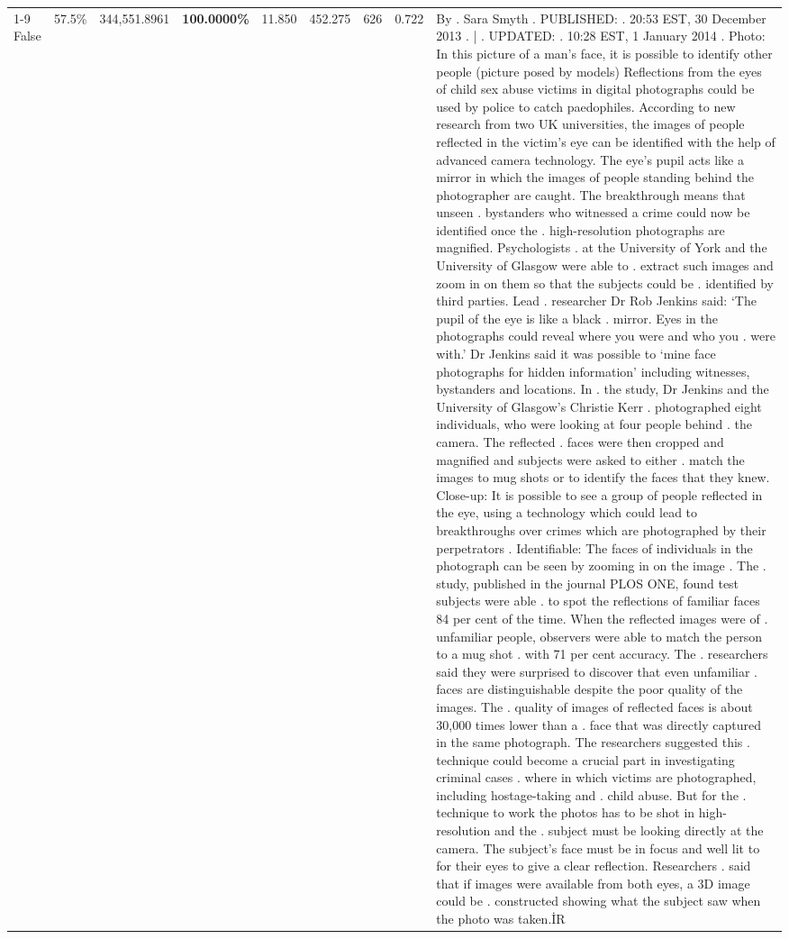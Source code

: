 \begin{table}[H]
\begin{tabular}{lllrlllll}
\cline{1-9}
False & 57.5\% & 344,551.8961 & \bfseries \color{red} 100.0000\% & 11.850 & 452.275 & 626 & 0.722 & By . Sara Smyth . PUBLISHED: . 20:53 EST, 30 December 2013 . | . UPDATED: . 10:28 EST, 1 January 2014 . Photo: In this picture of a man's face, it is possible to identify other people (picture posed by models) Reflections from the eyes of child sex abuse victims in digital photographs could be used by police to catch paedophiles. According to new research from two UK universities, the images of people reflected in the victim's eye can be identified with the help of advanced camera technology. The eye's pupil acts like a mirror in which the images of people standing behind the photographer are caught. The breakthrough means that unseen . bystanders who witnessed a crime could now be identified once the . high-resolution photographs are magnified. Psychologists . at the University of York and the University of Glasgow were able to . extract such images and zoom in on them so that the subjects could be . identified by third parties. Lead . researcher Dr Rob Jenkins said: ‘The pupil of the eye is like a black . mirror. Eyes in the photographs could reveal where you were and who you . were with.' Dr Jenkins said it was possible to ‘mine face photographs for hidden information' including witnesses, bystanders and locations. In . the study, Dr Jenkins and the University of Glasgow's Christie Kerr . photographed eight individuals, who were looking at four people behind . the camera. The reflected . faces were then cropped and magnified and subjects were asked to either . match the images to mug shots or to identify the faces that they knew. Close-up: It is possible to see a group of people reflected in the eye, using a technology which could lead to breakthroughs over crimes which are photographed by their perpetrators . Identifiable: The faces of individuals in the photograph can be seen by zooming in on the image . The . study, published in the journal PLOS ONE, found test subjects were able . to spot the reflections of familiar faces 84 per cent of the time. When the reflected images were of . unfamiliar people, observers were able to match the person to a mug shot . with 71 per cent accuracy. The . researchers said they were surprised to discover that even unfamiliar . faces are distinguishable despite the poor quality of the images. The . quality of images of reflected faces is about 30,000 times lower than a . face that was directly captured in the same photograph. The researchers suggested this . technique could become a crucial part in investigating criminal cases . where in which victims are photographed, including hostage-taking and . child abuse. But for the . technique to work the photos has to be shot in high-resolution and the . subject must be looking directly at the camera. The subject's face must be in focus and well lit to for their eyes to give a clear reflection. Researchers . said that if images were available from both eyes, a 3D image could be . constructed showing what the subject saw when the photo was taken.İR \\

\end{tabular}
\end{table}
